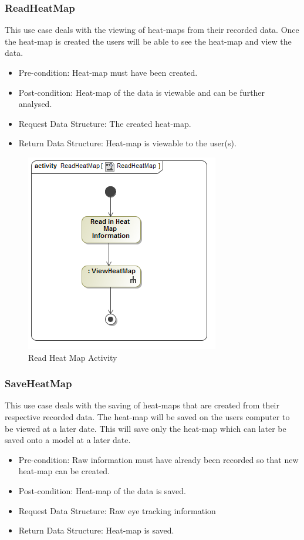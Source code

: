 	\subsubsection{ReadHeatMap}
	This use case deals with the viewing of heat-maps from their recorded data. Once the heat-map is created the users will be able to see the heat-map and view the data.
	\begin{itemize}
		\item Pre-condition: Heat-map must have been created.
		\item Post-condition: Heat-map of the data is viewable and can be further analysed.
		\item Request Data Structure: The created heat-map.
		\item Return Data Structure: Heat-map is viewable to the user(s).
	\end{itemize}
	
	\begin{figure}[!ht]
		\centering
		\includegraphics[scale=0.5]{Diagrams/Activity_Diagram__ReadHeatMap__ReadHeatMap.png}
		\caption{Read Heat Map Activity}
	\end{figure}
	
	\subsubsection{SaveHeatMap}
	This use case deals with the saving of heat-maps that are created from their respective recorded data. The heat-map will be saved on the users computer to be viewed at a later date. This will save only the heat-map which can later be saved onto a model at a later date.
	\begin{itemize}
		\item Pre-condition: Raw information must have already been recorded so that new heat-map can be created.
		\item Post-condition: Heat-map of the data is saved.
		\item Request Data Structure: Raw eye tracking information
		\item Return Data Structure: Heat-map is saved.
	\end{itemize}
	
